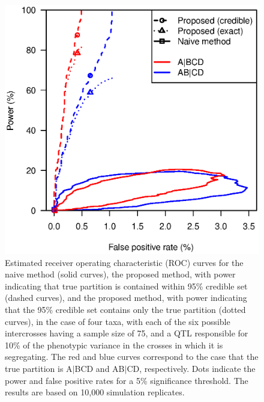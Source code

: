 \documentclass[12pt,letterpaper]{article}
\begin{document}
\newpage
\begin{figure}
\centering
\includegraphics[width=\textwidth]{Figs/fig3.eps}

\vspace{1cm}

\caption{Estimated receiver operating characteristic (ROC) curves for the
  naive method (solid curves), the proposed method, with power
  indicating that true
  partition is contained within 95\% credible
  set (dashed curves), and the proposed method, with power indicating
  that the 95\% credible set contains only the true partition (dotted curves), 
  in the case of four taxa, with each of the six possible intercrosses
  having a sample size of 75, and a QTL responsible for 10\% of the
  phenotypic variance in the crosses in which it is segregating.  The
  red and blue curves correspond to the case that the true partition is
  A$|$BCD and AB$|$CD, respectively.  Dots indicate the power and
  false positive rates for a 5\% significance threshold.  The results are based on
  10,000 simulation replicates.\label{fig:roc}}
\end{figure}
\end{document}
